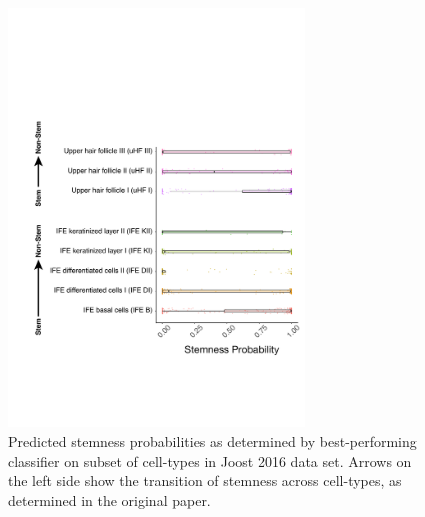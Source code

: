 \documentclass[10pt,conference,compsocconf]{IEEEtran}
\begin{document}
\begin{figure}[H]
	\centering
	\includegraphics[width=0.7\textwidth]{joost.pdf}
	\caption{Predicted stemness probabilities as determined by best-performing classifier on subset of cell-types in Joost 2016 \cite{Joost2016} data set. Arrows on the left side show the transition of stemness across cell-types, as determined in the original paper.}
	\label{fig:joost}
\end{figure}

	
\end{document}
